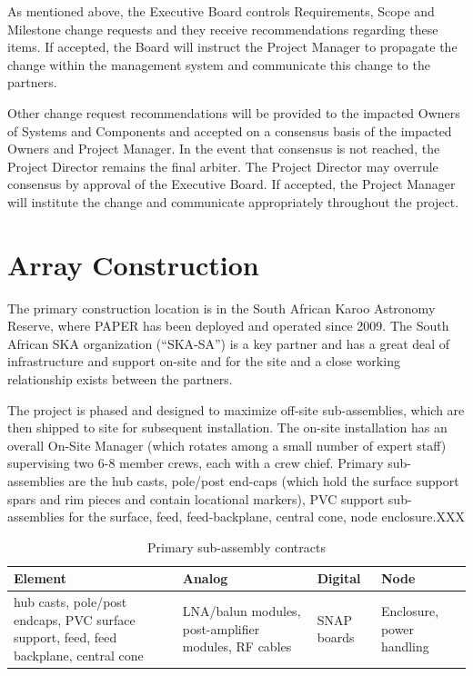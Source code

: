 \documentclass[preprint]{aastex}
\begin{document}
As mentioned above, the Executive Board controls Requirements, Scope and Milestone change requests
and they receive recommendations regarding these items.  If accepted, the Board will instruct the Project Manager to 
propagate the change within the management system and communicate this change to the partners.

Other change request recommendations will be provided to the impacted Owners of Systems and
Components and accepted on a consensus basis of the impacted Owners and Project Manager.  
In the event that consensus is not reached, the Project Director remains the final arbiter.  The Project 
Director may overrule consensus by approval of the Executive Board.  If accepted, the Project Manager 
will institute the change and communicate appropriately throughout the project.

\section{Array Construction}
\label{sec:construction}
The primary construction location is in the South African Karoo Astronomy Reserve, where PAPER has been deployed
and operated since 2009.  The South African SKA organization (``SKA-SA'') is a key partner and has a great deal of
infrastructure and support on-site and for the site and a close working relationship exists between the partners.

The project is phased and designed to maximize off-site sub-assemblies, which are then shipped to site for subsequent
installation.  The on-site installation has an overall On-Site Manager (which rotates among a small number of expert
staff) supervising two 6-8 member crews, each with a crew chief.  Primary sub-assemblies are the hub casts, pole/post end-caps 
(which hold the surface support spars and rim pieces and contain locational markers), PVC support sub-assemblies 
for the surface, feed, feed-backplane, central cone, node enclosure.XXX

\begin{table}[tbh]
\centering
\label{tab:subassycontracts}
\caption{Primary sub-assembly contracts}
\begin{tabular}{| p{1.4in} | p{1.4in} | p{1.4in} | p{1.4in} |}\hline
\textbf{Element} & \textbf{Analog} & \textbf{Digital} & \textbf{Node} \\ \hline
hub casts, pole/post endcaps, PVC surface support, feed, feed backplane, central cone &
LNA/balun modules, post-amplifier modules, RF cables &
SNAP boards &
Enclosure, power handling \\ \hline
\end{tabular}
\end{table}
\end{document}
